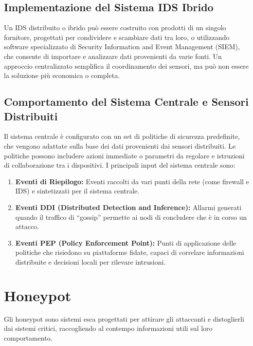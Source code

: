 \subsection{Implementazione del Sistema IDS Ibrido}

Un IDS distribuito o ibrido può essere costruito con prodotti di un singolo fornitore, progettati per condividere e scambiare dati tra loro, o utilizzando software specializzato di Security Information and Event Management (SIEM), che consente di importare e analizzare dati provenienti da varie fonti. Un approccio centralizzato semplifica il coordinamento dei sensori, ma può non essere la soluzione più economica o completa.

\subsection{Comportamento del Sistema Centrale e Sensori Distribuiti}

Il sistema centrale è configurato con un set di politiche di sicurezza predefinite, che vengono adattate sulla base dei dati provenienti dai sensori distribuiti. Le politiche possono includere azioni immediate o parametri da regolare e istruzioni di collaborazione tra i dispositivi. I principali input del sistema centrale sono:

\begin{enumerate}
    \item \textbf{Eventi di Riepilogo:} Eventi raccolti da vari punti della rete (come firewall e IDS) e sintetizzati per il sistema centrale.
    
    \item \textbf{Eventi DDI (Distributed Detection and Inference):} Allarmi generati quando il traffico di ``gossip'' permette ai nodi di concludere che è in corso un attacco.
    
    \item \textbf{Eventi PEP (Policy Enforcement Point):} Punti di applicazione delle politiche che risiedono su piattaforme fidate, capaci di correlare informazioni distribuite e decisioni locali per rilevare intrusioni.
\end{enumerate}

\section{Honeypot}

Gli honeypot sono sistemi esca progettati per attirare gli attaccanti e distoglierli dai sistemi critici, raccogliendo al contempo informazioni utili sul loro comportamento.

